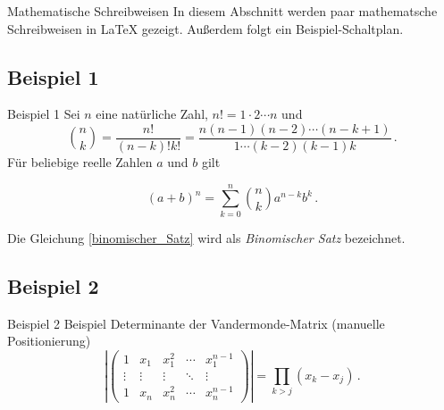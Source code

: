 
\begin{frame}{Mathematische Schreibweisen}
In diesem Abschnitt werden paar mathematsche Schreibweisen in LaTeX gezeigt. Außerdem folgt ein Beispiel-Schaltplan.
      
\end{frame}


\subsection{Beispiel 1}
\begin{frame}{Beispiel 1}
Sei $n$ eine natürliche Zahl, $n!=1 \cdot 2 \cdots n$ und
\[
\binom{n}{k} = \frac{n!}{(n-k)!k!} =
\frac{n(n-1)(n-2)\cdots(n-k+1)}{1 \cdots (k-2)(k-1)k} \,.
\]
Für beliebige reelle Zahlen $a$ und $b$ gilt

\begin{equation}
(a+b)^n = \sum_{k=0}^n \binom{n}{k} a^{n-k} b^k \,.
\label{binomischer_Satz}
\end{equation}

Die Gleichung \eqref{binomischer_Satz} wird als {\em Binomischer Satz} bezeichnet.
      
\end{frame}



\subsection{Beispiel 2}
\begin{frame}{Beispiel 2}
Beispiel
Determinante der Vandermonde-Matrix (manuelle Positionierung)\[
\left|\left(\begin{array}{ccccc}
1 & x_1 & x_1^2 & \cdots & x_1^{n-1} \\
\vdots & \vdots & \vdots & \ddots & \vdots \\
1 & x_n & x_n^2 & \cdots & x_n^{n-1}
\end{array}\right)\right| = \prod_{k>j}(x_k-x_j) \,.
\]
      
\end{frame}



